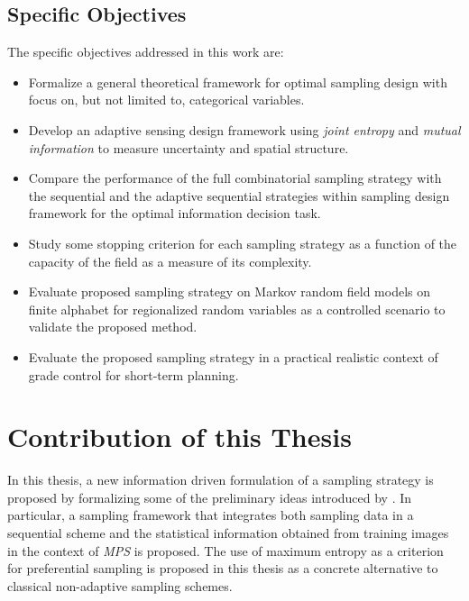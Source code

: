 \subsection{Specific Objectives}
\label{sec_Spec_Obj}

The specific objectives addressed in this work are:

\begin{itemize}
	\item Formalize a general theoretical framework for optimal sampling design with focus on, but not limited to, categorical variables. 
	\item Develop an adaptive sensing design framework using \emph{joint entropy} and \emph{mutual information} to measure uncertainty and spatial structure. 
	\item Compare the performance of the full combinatorial sampling strategy with the sequential and the adaptive sequential strategies within sampling design framework for the optimal information decision task.
	\item Study some stopping criterion for each sampling strategy as a function of the capacity of the field as a measure of its complexity.
	\item Evaluate proposed sampling strategy on Markov random field models on finite alphabet for regionalized random variables as a controlled scenario to validate the proposed method.
	\item Evaluate the proposed sampling strategy in a practical realistic context of grade control for short-term planning.
\end{itemize}









\section{Contribution of this Thesis}

In this thesis, a new information driven formulation of a sampling strategy is proposed by formalizing some of the preliminary ideas introduced by \cite{wellman_2013}. In particular, a sampling framework that integrates both sampling data in a sequential scheme and the statistical information obtained from training images in the context of \emph{MPS} is proposed. The use of maximum entropy as a criterion for preferential sampling is proposed in this thesis as a concrete alternative to classical non-adaptive sampling schemes.

